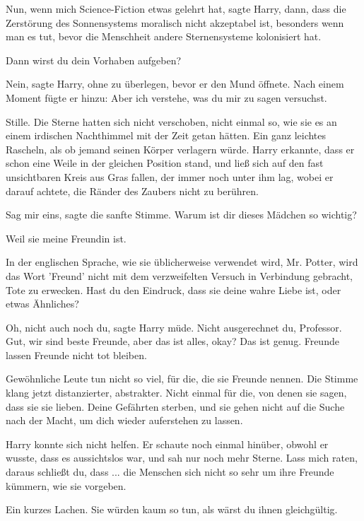 \glqq Nun, wenn mich Science-Fiction etwas gelehrt hat\grqq{}, sagte Harry,
\glqq dann, dass die Zerstörung des Sonnensystems moralisch nicht akzeptabel
ist, besonders wenn man es tut, bevor die Menschheit andere Sternensysteme
kolonisiert hat.\grqq{}

\glqq Dann wirst du dein Vorhaben aufgeben?\grqq{}

\glqq Nein\grqq{}, sagte Harry, ohne zu überlegen, bevor er den Mund öffnete.
Nach einem Moment fügte er hinzu: \glqq Aber ich verstehe, was du mir zu sagen
versuchst.\grqq{}

Stille. Die Sterne hatten sich nicht verschoben, nicht einmal so, wie sie es an
einem irdischen Nachthimmel mit der Zeit getan hätten. Ein ganz leichtes
Rascheln, als ob jemand seinen Körper verlagern würde. Harry erkannte, dass er
schon eine Weile in der gleichen Position stand, und ließ sich auf den fast
unsichtbaren Kreis aus Gras fallen, der immer noch unter ihm lag, wobei er
darauf achtete, die Ränder des Zaubers nicht zu berühren.

\glqq Sag mir eins\grqq{}, sagte die sanfte Stimme. \glqq Warum ist dir dieses
Mädchen so wichtig?\grqq{}

\glqq Weil sie meine Freundin ist.\grqq{}

\glqq In der englischen Sprache, wie sie üblicherweise verwendet wird, Mr.
Potter, wird das Wort 'Freund' nicht mit dem verzweifelten Versuch in Verbindung
gebracht, Tote zu erwecken. Hast du den Eindruck, dass sie deine wahre Liebe
ist, oder etwas Ähnliches?\grqq{}

\glqq Oh, nicht auch noch du\grqq{}, sagte Harry müde. \glqq Nicht ausgerechnet
du, Professor. Gut, wir sind beste Freunde, aber das ist alles, okay? Das ist
genug. Freunde lassen Freunde nicht tot bleiben.\grqq{}

\glqq Gewöhnliche Leute tun nicht so viel, für die, die sie Freunde
nennen.\grqq{} Die Stimme klang jetzt distanzierter, abstrakter. \glqq Nicht
einmal für die, von denen sie sagen, dass sie sie lieben. Deine Gefährten
sterben, und sie gehen nicht auf die Suche nach der Macht, um dich wieder
auferstehen zu lassen.\grqq{}

Harry konnte sich nicht helfen. Er schaute noch einmal hinüber, obwohl er
wusste, dass es aussichtslos war, und sah nur noch mehr Sterne. \glqq Lass mich
raten, daraus schließt du, dass ... die Menschen sich nicht so sehr um ihre
Freunde kümmern, wie sie vorgeben.\grqq{}

Ein kurzes Lachen. \glqq Sie würden kaum so tun, als wärst du ihnen
gleichgültig.\grqq{}

